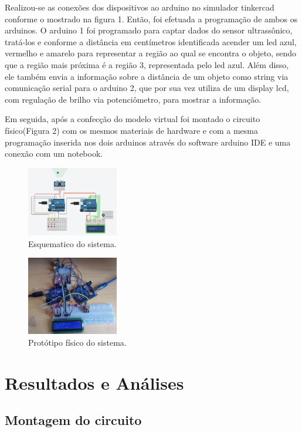 \documentclass[conference]{IEEEtran}
\begin{document}
Realizou-se as conexões dos dispositivos ao arduino no simulador tinkercad conforme o mostrado na figura 1.
Então, foi efetuada a programação de ambos os arduinos. O arduino 1 foi programado para captar dados do sensor ultrassônico, tratá-los
e conforme a distância em centímetros identificada acender um led azul, vermelho e amarelo para representar a região ao qual se encontra o objeto, sendo que a região mais próxima é a região 3, representada pelo led azul.
Além disso, ele também envia a informação sobre a distância de um objeto como string via comunicação serial para o arduino 2, que por sua vez utiliza de um display lcd, com regulação de brilho via potenciômetro, para mostrar a informação.

Em seguida, após a confecção do modelo virtual foi montado o circuito físico(Figura 2) com os mesmos materiais de hardware e com a mesma programação inserida nos dois arduinos através do software arduino IDE e uma conexão com um notebook.


\begin{figure}[htbp]
    \centerline{
        \includegraphics[width=4cm]{images/esquema-arduino.png}
    }
    \caption{Esquematico do sistema.}
    \label{fig}
\end{figure}

\begin{figure}[htbp]
    \centerline{
        \includegraphics[width=4cm]{images/esquema-arduino-fisico.png}
    }
    \caption{Protótipo físico do sistema.}
    \label{fig}
\end{figure}

\section{Resultados e Análises}

\subsection{Montagem do circuito}
\end{document}
